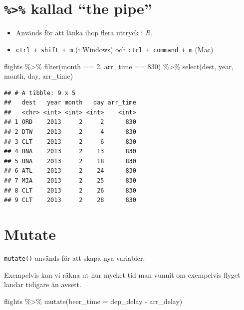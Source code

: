 \documentclass[
]{book}
\newenvironment{Shaded}{\begin{snugshade}}{\end{snugshade}}
\newcommand{\AttributeTok}[1]{\textcolor[rgb]{0.77,0.63,0.00}{#1}}
\newcommand{\DecValTok}[1]{\textcolor[rgb]{0.00,0.00,0.81}{#1}}
\newcommand{\FunctionTok}[1]{\textcolor[rgb]{0.00,0.00,0.00}{#1}}
\newcommand{\NormalTok}[1]{#1}
\newcommand{\SpecialCharTok}[1]{\textcolor[rgb]{0.00,0.00,0.00}{#1}}
\begin{document}
\hypertarget{kallad-the-pipe}{%
\section{\texorpdfstring{\texttt{\%\textgreater{}\%} kallad ``the pipe''}{\%\textgreater\% kallad ``the pipe''}}\label{kallad-the-pipe}}

\begin{itemize}
\item
  Används för att länka ihop flera uttryck i \emph{R}.
\item
  \texttt{ctrl\ +\ shift\ +\ m} (i Windows) och \texttt{ctrl\ +\ command\ +\ m} (Mac)
\end{itemize}

\begin{Shaded}
\begin{Highlighting}[]
\NormalTok{flights }\SpecialCharTok{\%\textgreater{}\%} 
  \FunctionTok{filter}\NormalTok{(month }\SpecialCharTok{==} \DecValTok{2}\NormalTok{, arr\_time }\SpecialCharTok{==} \DecValTok{830}\NormalTok{) }\SpecialCharTok{\%\textgreater{}\%} 
  \FunctionTok{select}\NormalTok{(dest, year, month, day, arr\_time)}
\end{Highlighting}
\end{Shaded}

\begin{verbatim}
## # A tibble: 9 x 5
##   dest   year month   day arr_time
##   <chr> <int> <int> <int>    <int>
## 1 ORD    2013     2     2      830
## 2 DTW    2013     2     4      830
## 3 CLT    2013     2     6      830
## 4 BNA    2013     2    13      830
## 5 BNA    2013     2    18      830
## 6 ATL    2013     2    24      830
## 7 MIA    2013     2    25      830
## 8 CLT    2013     2    26      830
## 9 CLT    2013     2    28      830
\end{verbatim}

\hypertarget{mutate}{%
\section{Mutate}\label{mutate}}

\texttt{mutate()} används för att skapa nya variabler.

Exempelvis kan vi räkna ut hur mycket tid man vunnit om exempelvis flyget landar tidigare än avsett.

\begin{Shaded}
\begin{Highlighting}[]
\NormalTok{flights }\SpecialCharTok{\%\textgreater{}\%} 
  \FunctionTok{mutate}\NormalTok{(}\AttributeTok{beer\_time =}\NormalTok{ dep\_delay }\SpecialCharTok{{-}}\NormalTok{ arr\_delay)}
\end{Highlighting}
\end{Shaded}
\end{document}
